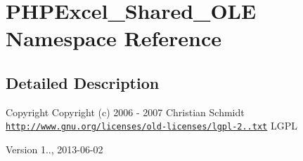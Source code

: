 \hypertarget{namespacePHPExcel__Shared__OLE}{}\section{P\+H\+P\+Excel\+\_\+\+Shared\+\_\+\+O\+LE Namespace Reference}
\label{namespacePHPExcel__Shared__OLE}


\subsection{Detailed Description}
\begin{DoxyCopyright}{Copyright}
Copyright (c) 2006 -\/ 2007 Christian Schmidt  \href{http://www.gnu.org/licenses/old-licenses/lgpl-2.1.txt}{\tt http\+://www.\+gnu.\+org/licenses/old-\/licenses/lgpl-\/2..\+txt} L\+G\+PL 
\end{DoxyCopyright}
\begin{DoxyVersion}{Version}
1.., 2013-\/06-\/02 
\end{DoxyVersion}
